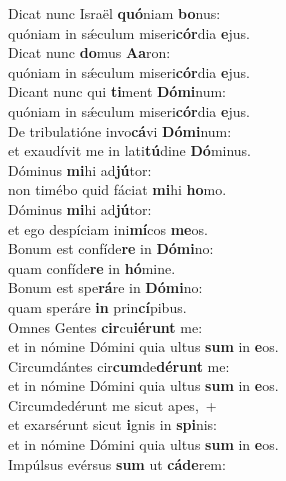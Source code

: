 \evenverse Dicat nunc Israël \textbf{quó}niam \textbf{bo}nus:~\*\\
\evenverse quóniam in sǽculum miseri\textbf{cór}dia \textbf{e}jus.\\
\oddverse Dicat nunc \textbf{do}mus \textbf{A}\textbf{a}ron:~\*\\
\oddverse quóniam in sǽculum miseri\textbf{cór}dia \textbf{e}jus.\\
\evenverse Dicant nunc qui \textbf{ti}ment \textbf{Dó}\textbf{mi}num:~\*\\
\evenverse quóniam in sǽculum miseri\textbf{cór}dia \textbf{e}jus.\\
\oddverse De tribulatióne invo\textbf{cá}vi \textbf{Dó}\textbf{mi}num:~\*\\
\oddverse et exaudívit me in lati\textbf{tú}dine \textbf{Dó}minus.\\
\evenverse Dóminus \textbf{mi}hi ad\textbf{jú}tor:~\*\\
\evenverse non timébo quid fáciat \textbf{mi}hi \textbf{ho}mo.\\
\oddverse Dóminus \textbf{mi}hi ad\textbf{jú}tor:~\*\\
\oddverse et ego despíciam ini\textbf{mí}cos \textbf{me}os.\\
\evenverse Bonum est confíde\textbf{re} in \textbf{Dó}\textbf{mi}no:~\*\\
\evenverse quam confíde\textbf{re} in \textbf{hó}mine.\\
\oddverse Bonum est spe\textbf{rá}re in \textbf{Dó}\textbf{mi}no:~\*\\
\oddverse quam speráre \textbf{in} prin\textbf{cí}pibus.\\
\evenverse Omnes Gentes \textbf{cir}cu\textbf{ié}\textbf{runt} me:~\*\\
\evenverse et in nómine Dómini quia ultus \textbf{sum} in \textbf{e}os.\\
\oddverse Circumdántes cir\textbf{cum}de\textbf{dé}\textbf{runt} me:~\*\\
\oddverse et in nómine Dómini quia ultus \textbf{sum} in \textbf{e}os.\\
\evenverse Circumdedérunt me sicut apes,~+\\
\evenverse  et exarsérunt sicut \textbf{i}gnis in \textbf{spi}nis:~\*\\
\evenverse et in nómine Dómini quia ultus \textbf{sum} in \textbf{e}os.\\
\oddverse Impúlsus evérsus \textbf{sum} ut \textbf{cá}\textbf{de}rem:~\*\\

